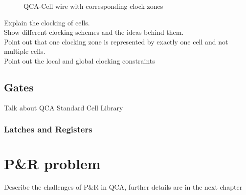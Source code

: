 \begin{figure}
%
	
	\caption{QCA-Cell wire with corresponding clock zones} \label{fig:QCAClock}
\end{figure}

Explain the clocking of cells. \\
Show different clocking schemes and the ideas behind them. \\
Point out that one clocking zone is represented by exactly one cell and not multiple cells. \\
Point out the local and global clocking constraints

\subsection{Gates}
Talk about QCA Standard Cell Library

\subsubsection{Latches and Registers}



\section{P\&R problem}

Describe the challenges of P\&R in QCA, further details are in the next chapter